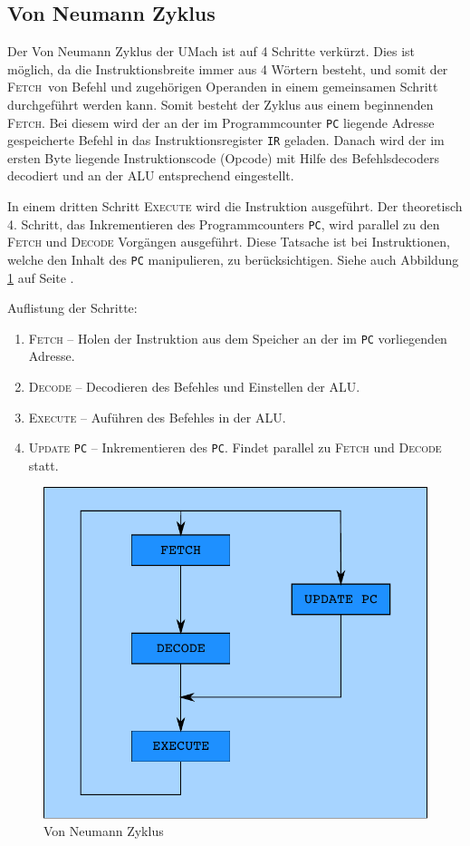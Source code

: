 \subsection[Neumann Zyklus]{Von Neumann Zyklus}
\label{subsec:Neumann-Zyklus}

Der Von Neumann Zyklus der UMach ist auf 4 Schritte verkürzt. Dies ist möglich,
da die Instruktionsbreite immer aus 4 Wörtern besteht, und somit der 
\glqq\textsc{Fetch}\grqq\ von 
Befehl und zugehörigen Operanden in einem gemeinsamen Schritt durchgeführt
werden kann. Somit besteht der Zyklus aus einem beginnenden \textsc{Fetch}. Bei
diesem wird der an der im Programmcounter \texttt{PC} liegende Adresse
gespeicherte Befehl in das Instruktionsregister \texttt{IR} geladen. Danach
wird der im ersten Byte liegende Instruktionscode (Opcode) mit Hilfe des
Befehlsdecoders decodiert und an der \textsc{ALU} entsprechend eingestellt.

In einem dritten Schritt \textsc{Execute} wird die Instruktion ausgeführt. Der
theoretisch 4. Schritt, das Inkrementieren des Programmcounters \texttt{PC},
wird parallel zu den \textsc{Fetch} und \textsc{Decode} Vorgängen ausgeführt.
Diese Tatsache ist bei Instruktionen, welche den Inhalt des \texttt{PC}
manipulieren, zu berücksichtigen. Siehe auch Abbildung \ref{fig:Neumann-Zyklus}
auf Seite \pageref{fig:Neumann-Zyklus}.

Auflistung der Schritte:

\begin{enumerate}
 \item \textsc{Fetch} --
       Holen der Instruktion aus dem Speicher an der im \texttt{PC} 
       vorliegenden Adresse.
 \item \textsc{Decode} --
       Decodieren des Befehles und Einstellen der \textsc{ALU}.
 \item \textsc{Execute} --
       Auführen des Befehles in der \textsc{ALU}.
 \item \textsc{Update} \texttt{PC} --
       Inkrementieren des \texttt{PC}. Findet parallel zu \textsc{Fetch} und
       \textsc{Decode} statt.
\end{enumerate}

\begin{figure}[h!tp]
 \centering
 \includegraphics{./img/zyklus.pdf}
 \caption{Von Neumann Zyklus }
 \label{fig:Neumann-Zyklus}
\end{figure}

